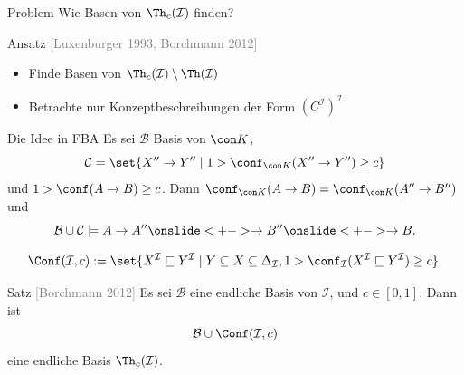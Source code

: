 \documentclass[ngerman]{beamer}
\newcommand{\pseudocite}[1]{\textcolor{gray}{[#1]}}
\begin{document}
\begin{frame}

  \onslide<+->

  \begin{block}{Problem}
    Wie Basen von $\Th_{c}(\mathcal{I})$ finden?
  \end{block}

  \onslide<+->

  \begin{block}{Ansatz \pseudocite{Luxenburger 1993, Borchmann 2012}}
    \begin{itemize}
    \item<+-> Finde Basen von $\Th_{c}(\mathcal{I}) \setminus \Th(\mathcal{I})$
    \item<+-> Betrachte nur Konzeptbeschreibungen der Form $(C^{\mathcal{I}})^{\mathcal{I}}$
    \end{itemize}
  \end{block}

  \onslide<+->
  
  \begin{block}{Die Idee in FBA}
    \onslide<+->%
    Es sei $\mathcal{B}$ Basis von $\con K$,
    \begin{equation*}
      \mathcal{C} = \set{ X'' \to Y'' \mid 1 > \conf_{\con K}(X'' \to Y'') \ge c }
    \end{equation*}
    und $1 > \conf(A \to B) \ge c$.  \onslide<+-> Dann $\conf_{\con K}(A \to B) =
    \conf_{\con K}(A'' \to B'')$ \onslide<+-> und
    \begin{equation*}
      \mathcal{B} \cup \mathcal{C} \models A \to A'' \onslide<+-> \to B'' \onslide<+->
      \to B.
    \end{equation*}
  \end{block}

\end{frame}

\begin{frame}

  \onslide<+->

  \begin{Definition}
    \begin{equation*}
      \Conf(\mathcal{I}, c) := \set{ X^{\mathcal{I}} \sqsubseteq Y^{\mathcal{I}} \mid Y
        \subseteq X \subseteq \Delta_{\mathcal{I}}, 1 > \conf_{\mathcal{I}}(
        X^{\mathcal{I}} \sqsubseteq Y^{\mathcal{I}}) \ge c}.
    \end{equation*}
  \end{Definition}

  \onslide<+->

  \begin{block}{Satz \pseudocite{Borchmann 2012}}
    Es sei $\mathcal{B}$ eine endliche Basis von $\mathcal{I}$, und $c \in [0, 1]$.  Dann
    ist 
    \begin{equation*}
      \mathcal{B} \cup \Conf(\mathcal{I},c)
    \end{equation*}
    eine endliche Basis $\Th_c(\mathcal{I})$.
  \end{block}
  
\end{frame}
\end{document}
